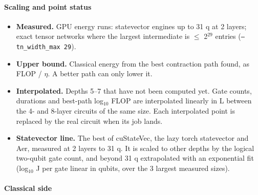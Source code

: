\paragraph{Scaling and point status}

\begin{itemize}
  \item \textbf{Measured.} GPU energy runs: statevector engines up to 31 q at 2 layers; exact tensor networks where the largest intermediate is $\le$ 2$^{29}$ entries (\texttt{--tn\_width\_max 29}).
  \item \textbf{Upper bound.} Classical energy from the best contraction path found, as FLOP / $\eta$. A better path can only lower it.
  \item \textbf{Interpolated.} Depths 5--7 that have not been computed yet. Gate counts, durations and best-path log$_{10}$ FLOP are interpolated linearly in L between the 4- and 8-layer circuits of the same size. Each interpolated point is replaced by the real circuit when its job lands.
  \item \textbf{Statevector line.} The best of cuStateVec, the lazy torch statevector and Aer, measured at 2 layers to 31 q. It is scaled to other depths by the logical two-qubit gate count, and beyond 31 q extrapolated with an exponential fit (log$_{10}$ J per gate linear in qubits, over the 3 largest measured sizes).

\end{itemize}
\paragraph{Classical side}

